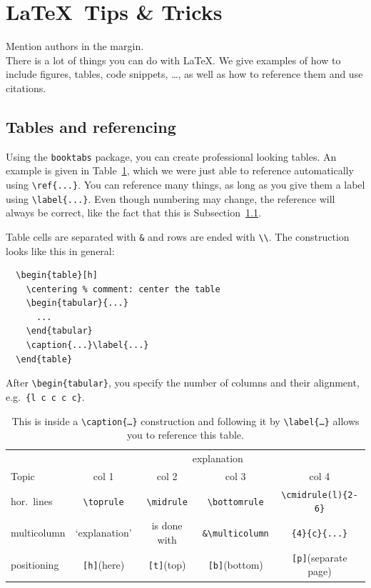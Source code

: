 \documentclass[a4paper,11pt]{article}
\newcommand{\note}[1]{{\colorbox{yellow!40!white}{#1}}}
\begin{document}
\reversemarginpar
\section{\LaTeX~Tips \& Tricks}\label{sec:Feature}
\note{Mention authors in the margin.}\\
There is a lot of things you can do with \LaTeX. We give examples of how to include figures, tables, code snippets, \dots, as well as how to reference them and use citations.

\subsection{Tables and referencing}\label{ssec:tables}

Using the \texttt{booktabs} package, you can create professional looking tables. An example is given in Table~\ref{tab:example}, which we were just able to reference automatically using \verb|\ref{...}|. You can reference many things, as long as you give them a label using \verb|\label{...}|. Even though numbering may change, the reference will always be correct, like the fact that this is Subsection~\ref{ssec:tables}.

Table cells are separated with \verb|&| and rows are ended with \verb|\\|. The construction looks like this in general:
\begin{verbatim}
  \begin{table}[h]
    \centering % comment: center the table
    \begin{tabular}{...}
      ...
    \end{tabular}
    \caption{...}\label{...}
  \end{table}
\end{verbatim}
After \verb|\begin{tabular}|, you specify the number of columns and their alignment, e.g.\ \verb|{l c c c c}|.

\begin{table}[h]
  \centering
\begin{tabular}{l c c c c}
  \toprule
& \multicolumn{4}{c}{explanation} \\
\cmidrule(l){2-5}
Topic & col 1 & col 2 & col 3 & col 4 \\
\midrule %
hor.\ lines & \verb|\toprule| & \verb|\midrule| & \verb|\bottomrule| & \verb|\cmidrule(l){2-6}| \\
multicolumn & `explanation' & is done with & \verb|&\multicolumn| & \verb|{4}{c}{...}| \\
\midrule
\midrule
positioning & \texttt{[h]}(here) & \texttt{[t]}(top) & \texttt{[b]}(bottom) & \texttt{[p]}(separate page) \\
\bottomrule
\end{tabular}
\caption{This is inside a \texttt{\textbackslash caption\{\dots\}} construction and following it by \texttt{\textbackslash label\{\dots\}} allows you to reference this table.}
\label{tab:example}
\end{table}
\end{document}
